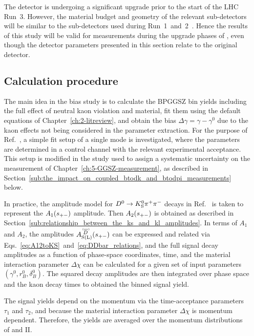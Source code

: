 The \lhcb detector is undergoing a significant upgrade prior to the start of the LHC Run~3. However, the material budget and geometry of the relevant sub-detectors will be similar to the sub-detectors used during Run~1~and~2~\cite{VELOUpgradeTDR,PIDUpgradeTDR}. Hence the results of this study will be valid for measurements during the upgrade phases of \lhcb, even though the detector parameters presented in this section relate to the original \lhcb detector.


\subsection{Calculation procedure} %
\label{sub:calculation_procedure}

The main idea in the bias study is to calculate the BPGGSZ bin yields including the full effect of neutral kaon \CP violation and material, fit them using the default equations of Chapter~\ref{ch:2-litreview}, and obtain the bias $\Delta\gamma = \gamma - \gamma^0$ due to the kaon effects not being considered in the parameter extraction. For the purpose of Ref.~\cite{KsCPV}, a simple fit setup of a single \BtoDh mode is investigated, where the \Ki parameters are determined in a control channel with the relevant experimental acceptance. This setup is modified in the study used to assign a systematic uncertainty on the \lhcb measurement of Chapter~\ref{ch:5-GGSZ-measurement}, as described in Section~\ref{sub:the_impact_on_coupled_btodk_and_btodpi_measurements} below.


In practice, the amplitude model for ${{D}^0}\rightarrow{\ensuremath{{K}^0_{\mathrm{S}}}}{\ensuremath{{\pi}^+}}{\ensuremath{{\pi}^-}}$ decays in Ref.~\cite{Belle2018} is taken to represent the $A_1(s_{+-})$ amplitude. Then $A_2(s_{+-})$ is obtained as described in Section~\ref{sub:relationship_between_the_ks_and_kl_amplitudes}. In terms of $A_1$ and $A_2$, the amplitudes $\ADorDbSL(\spm)$ can be expressed and related via Eqs.~\eqref{eq:A12toKS}~and~\eqref{eq:DDbar_relations}, and the full signal decay amplitudes as a function of phase-space coordinates, time, and the material interaction parameter $\Delta\chi$ can be calculated for a given set of input parameters $(\gamma^0, r_B^0, \delta_B^0)$. The squared decay amplitudes are then integrated over phase space and the kaon decay times to obtained the binned signal yield.

The signal yields depend on the momentum via the time-acceptance parameters $\tau_1$ and $\tau_2$, and because the material interaction parameter $\Delta\chi$ is momentum dependent. Therefore, the yields are averaged over the \KS momentum distributions of \lhcb and \belle II. 


